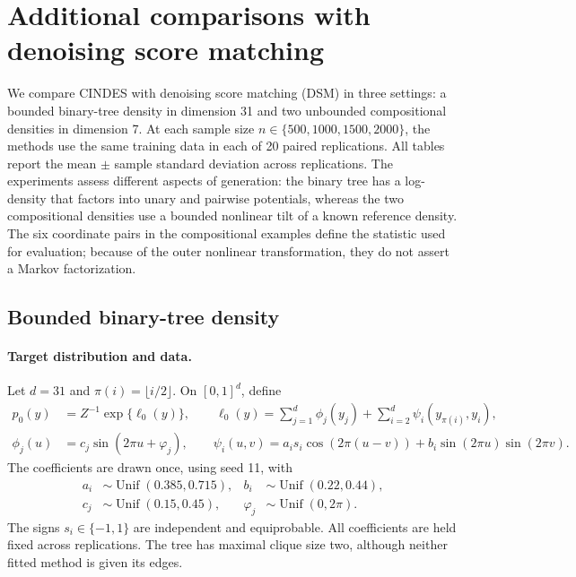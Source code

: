 \section{Additional comparisons with denoising score matching}
\label{sec:supp_dsm_experiments}

We compare CINDES with denoising score matching (DSM) in three settings: a
bounded binary-tree density in dimension 31 and two unbounded compositional
densities in dimension 7. At each sample size
$n\in\{500,1000,1500,2000\}$, the methods use the same training data in each
of 20 paired replications. All tables report the mean $\pm$ sample standard
deviation across replications. The experiments assess different aspects of
generation: the binary tree has a log-density that factors into unary and
pairwise potentials, whereas the two compositional densities use a bounded
nonlinear tilt of a known reference density. The six coordinate pairs in the
compositional examples define the statistic used for evaluation; because of
the outer nonlinear transformation, they do not assert a Markov factorization.

\subsection{Bounded binary-tree density}
\label{sec:supp_bounded_tree}

\paragraph{Target distribution and data.}
Let $d=31$ and $\pi(i)=\lfloor i/2\rfloor$. On $[0,1]^d$, define
\begin{align}
 p_0(y)&=Z^{-1}\exp\{\ell_0(y)\},\qquad
 \ell_0(y)=\sum_{j=1}^{d}\phi_j(y_j)
             +\sum_{i=2}^{d}\psi_i(y_{\pi(i)},y_i),\label{eq:supp_tree_density}\\
 \phi_j(u)&=c_j\sin(2\pi u+\varphi_j),\qquad
 \psi_i(u,v)=a_i s_i\cos(2\pi(u-v))
              +b_i\sin(2\pi u)\sin(2\pi v).\nonumber
\end{align}
The coefficients are drawn once, using seed 11, with
\begin{equation*}
\begin{aligned}
a_i&\sim\operatorname{Unif}(0.385,0.715), &
b_i&\sim\operatorname{Unif}(0.22,0.44),\\
c_j&\sim\operatorname{Unif}(0.15,0.45), &
\varphi_j&\sim\operatorname{Unif}(0,2\pi).
\end{aligned}
\end{equation*}
The signs $s_i\in\{-1,1\}$ are independent and equiprobable. All
coefficients are held fixed across replications. The tree has maximal
clique size two, although neither fitted method is given its edges.

